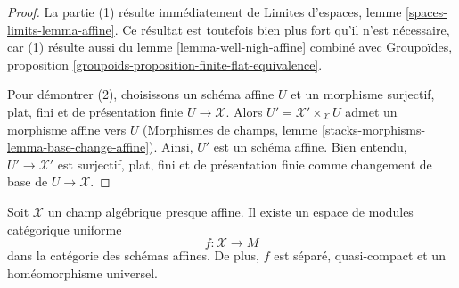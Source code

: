 \begin{proof}
La partie (1) résulte immédiatement de
Limites d'espaces, lemme \ref{spaces-limits-lemma-affine}.
Ce résultat est toutefois bien plus fort qu'il n'est nécessaire, car (1) résulte aussi du
lemme \ref{lemma-well-nigh-affine} combiné avec
Groupoïdes, proposition
\ref{groupoids-proposition-finite-flat-equivalence}.

\medskip\noindent
Pour démontrer (2), choisissons un schéma affine $U$ et un
morphisme surjectif, plat, fini et de présentation finie $U \to \mathcal{X}$.
Alors $U' = \mathcal{X}' \times_\mathcal{X} U$ admet un morphisme
affine vers $U$ (Morphismes de champs, lemme
\ref{stacks-morphisms-lemma-base-change-affine}).
Ainsi, $U'$ est un schéma affine. Bien entendu,
$U' \to \mathcal{X}'$ est surjectif, plat, fini et de présentation finie
comme changement de base de $U \to \mathcal{X}$.
\end{proof}

\begin{lemma}
\label{lemma-well-nigh-affine-moduli-space}
Soit $\mathcal{X}$ un champ algébrique presque affine. Il existe
un espace de modules catégorique uniforme
$$
f : \mathcal{X} \longrightarrow M
$$
dans la catégorie des schémas affines. De plus,
$f$ est séparé, quasi-compact et un homéomorphisme universel.
\end{lemma}

